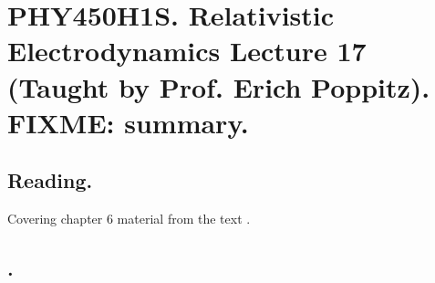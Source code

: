 
%

\chapter{PHY450H1S.  Relativistic Electrodynamics Lecture 17 (Taught by Prof. Erich Poppitz).  FIXME: summary.}
\label{chap:relativisticElectrodynamicsL17}
{}
\date{Mar 8, 2011}

\beginArtNoToc

\section{Reading.}

Covering chapter 6 material from the text \cite{landau1980classical}.


\section{.}

\EndArticle
